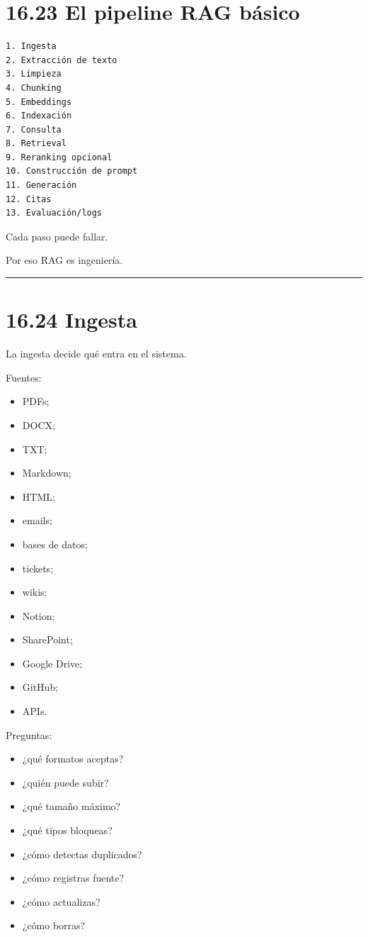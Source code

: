 \section{16.23 El pipeline RAG básico}\label{el-pipeline-rag-buxe1sico}

\begin{lstlisting}
1. Ingesta
2. Extracción de texto
3. Limpieza
4. Chunking
5. Embeddings
6. Indexación
7. Consulta
8. Retrieval
9. Reranking opcional
10. Construcción de prompt
11. Generación
12. Citas
13. Evaluación/logs
\end{lstlisting}

Cada paso puede fallar.

Por eso RAG es ingeniería.

\begin{center}\rule{0.5\linewidth}{0.5pt}\end{center}

\section{16.24 Ingesta}\label{ingesta}

La ingesta decide qué entra en el sistema.

Fuentes:

\begin{itemize}
\tightlist
\item
  PDFs;
\item
  DOCX;
\item
  TXT;
\item
  Markdown;
\item
  HTML;
\item
  emails;
\item
  bases de datos;
\item
  tickets;
\item
  wikis;
\item
  Notion;
\item
  SharePoint;
\item
  Google Drive;
\item
  GitHub;
\item
  APIs.
\end{itemize}

Preguntas:

\begin{itemize}
\tightlist
\item
  ¿qué formatos aceptas?
\item
  ¿quién puede subir?
\item
  ¿qué tamaño máximo?
\item
  ¿qué tipos bloqueas?
\item
  ¿cómo detectas duplicados?
\item
  ¿cómo registras fuente?
\item
  ¿cómo actualizas?
\item
  ¿cómo borras?
\end{itemize}

